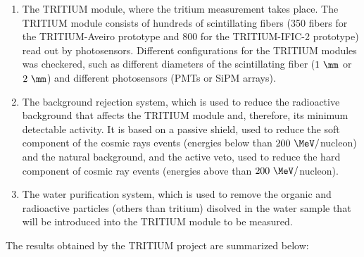 \begin{enumerate}

\item{} The TRITIUM module, where the tritium measurement takes place. The TRITIUM module consists of hundreds of scintillating fibers (350 fibers for the TRITIUM-Aveiro prototype and 800 for the TRITIUM-IFIC-2 prototype) read out by photosensors. Different configurations for the TRITIUM modules was checkered, such as different diameters of the scintillating fiber ($1~\mm$ or $2~\mm$) and different photosensors (PMTs or SiPM arrays).

\item{} The background rejection system, which is used to reduce the radioactive background that affects the TRITIUM module and, therefore, its minimum detectable activity. It is based on a passive shield, used to reduce the soft component of the cosmic rays events (energies below than $200~\MeV/$nucleon) and the natural background, and the active veto, used to reduce the hard component of cosmic ray events (energies above than $200~\MeV/$nucleon).

\item{} The water purification system, which is used to remove the organic and radioactive particles (others than tritium) disolved in the water sample that will be introduced into the TRITIUM module to be measured.

\end{enumerate} 

The results obtained by the TRITIUM project are summarized below:

